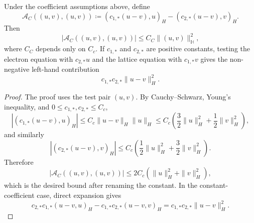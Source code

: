 \begin{lemma}
    \label{lem:app-ch2-rectangular-coupling-control}
    Under the coefficient assumptions above, define
    \[
        \mathcal{A}_C((u,v),(u,v))
        \coloneqq
        (c_{1,*}(u-v),u)_H
        -
        (c_{2,*}(u-v),v)_H.
    \]
    Then
    \[
        \left|\mathcal{A}_C((u,v),(u,v))\right|
        \le
        C_C\|(u,v)\|_{\mathbb{H}}^2,
    \]
    where \(C_C\) depends only on \(C_c\). If \(c_{1,*}\) and \(c_{2,*}\) are positive constants, testing the electron equation with \(c_{2,*}u\) and the lattice equation with \(c_{1,*}v\) gives the non-negative left-hand contribution
    \[
        c_{1,*}c_{2,*}\|u-v\|_H^2.
    \]
\end{lemma}
\begin{proof}
    The proof uses the test pair \((u,v)\). By Cauchy--Schwarz, Young's inequality, and \(0\le c_{1,*},c_{2,*}\le C_c\),
    \[
        |(c_{1,*}(u-v),u)_H|
        \le
        C_c\|u-v\|_H\|u\|_H
        \le
        C_c
        \left(
        \frac{3}{2}\|u\|_H^2+\frac{1}{2}\|v\|_H^2
        \right),
    \]
    and similarly
    \[
        |(c_{2,*}(u-v),v)_H|
        \le
        C_c
        \left(
        \frac{1}{2}\|u\|_H^2+\frac{3}{2}\|v\|_H^2
        \right).
    \]
    Therefore
    \[
        \left|\mathcal{A}_C((u,v),(u,v))\right|
        \le
        2C_c
        \left(
        \|u\|_H^2+\|v\|_H^2
        \right),
    \]
    which is the desired bound after renaming the constant. In the constant-coefficient case, direct expansion gives
    \[
        c_{2,*}c_{1,*}(u-v,u)_H
        -
        c_{1,*}c_{2,*}(u-v,v)_H
        =
        c_{1,*}c_{2,*}\|u-v\|_H^2.
    \]
\end{proof}

